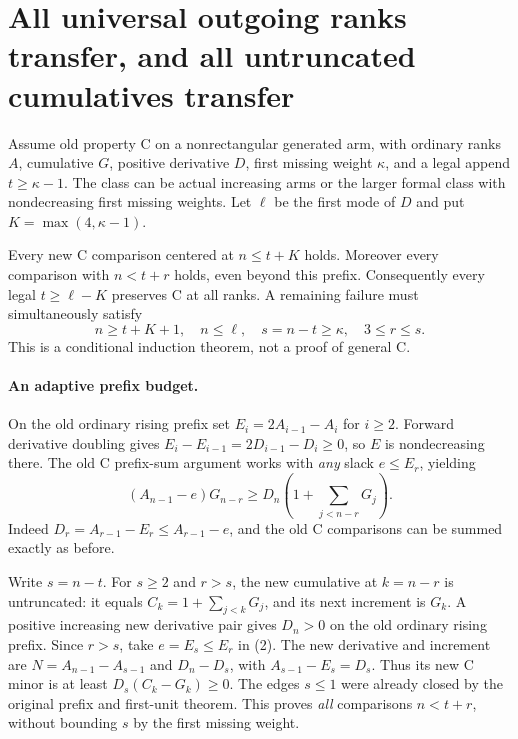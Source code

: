 \section{All universal outgoing ranks transfer, and all untruncated cumulatives transfer}
Assume old property C on a nonrectangular generated arm, with ordinary
ranks $A$, cumulative $G$, positive derivative $D$, first missing
weight $\kappa$, and a legal append $t\ge\kappa-1$.
The class can be actual increasing arms or the larger formal class
with nondecreasing first missing weights. Let $\ell$ be the first
mode of $D$ and put $K=\max(4,\kappa-1)$.

\begin{theorem}
Every new C comparison centered at $n\le t+K$ holds.
Moreover every comparison with $n<t+r$ holds, even beyond this
prefix. Consequently every legal $t\ge\ell-K$ preserves C at
all ranks. A remaining failure must simultaneously satisfy
\[
 n\ge t+K+1,\quad n\le\ell,\quad
               s=n-t\ge\kappa,\quad 3\le r\le s.             \tag{1}
\]
This is a conditional induction theorem, not a proof of general C.
\end{theorem}

\paragraph{An adaptive prefix budget.}
On the old ordinary rising prefix set $E_i=2A_{i-1}-A_i$ for
$i\ge2$. Forward derivative doubling gives
$E_i-E_{i-1}=2D_{i-1}-D_i\ge0$, so $E$ is nondecreasing there.
The old C prefix-sum argument works with \emph{any} slack
$e\le E_r$, yielding
\[
 (A_{n-1}-e)G_{n-r}
          \ge D_n\left(1+\sum_{j<n-r}G_j\right).              \tag{2}
\]
Indeed $D_r=A_{r-1}-E_r\le A_{r-1}-e$, and the old C
comparisons can be summed exactly as before.

Write $s=n-t$. For $s\ge2$ and $r>s$, the new cumulative at
$k=n-r$ is untruncated: it equals $C_k=1+\sum_{j<k}G_j$,
and its next increment is $G_k$. A positive increasing new
derivative pair gives $D_n>0$ on the old ordinary rising prefix.
Since $r>s$, take $e=E_s\le E_r$ in (2). The new derivative
and increment are
$N=A_{n-1}-A_{s-1}$ and $D_n-D_s$, with
$A_{s-1}-E_s=D_s$. Thus its new C minor is at least
$D_s(C_k-G_k)\ge0$. The edges $s\le1$ were already closed
by the original prefix and first-unit theorem. This proves
\emph{all} comparisons $n<t+r$, without bounding $s$ by
the first missing weight.

